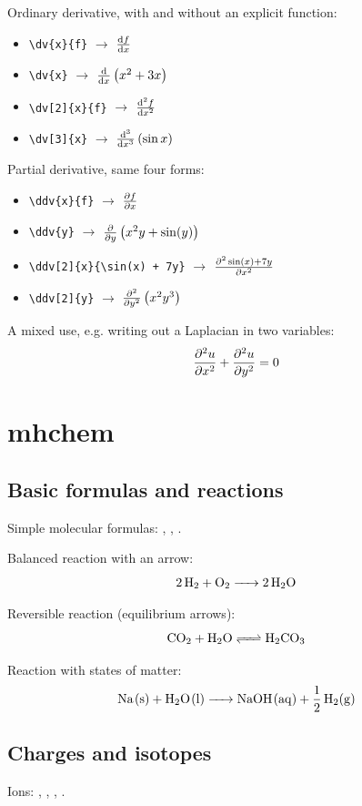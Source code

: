Ordinary derivative, with and without an explicit function:
\begin{itemize}
	\item \verb|\dv{x}{f}| \quad $\to$ \quad $\dv{x}{f}$
	\item \verb|\dv{x}| \quad $\to$ \quad $\dv{x}\left(x^2 + 3x\right)$
	\item \verb|\dv[2]{x}{f}| \quad $\to$ \quad $\dv[2]{x}{f}$
	\item \verb|\dv[3]{x}| \quad $\to$ \quad $\dv[3]{x}\left(\sin x\right)$
\end{itemize}

Partial derivative, same four forms:
\begin{itemize}
	\item \verb|\ddv{x}{f}| \quad $\to$ \quad $\ddv{x}{f}$
	\item \verb|\ddv{y}| \quad $\to$ \quad $\ddv{y}\left(x^2 y + \sin(y)\right)$
	\item \verb|\ddv[2]{x}{\sin(x) + 7y}| \quad $\to$ \quad $\ddv[2]{x}{\sin(x) + 7y}$
	\item \verb|\ddv[2]{y}| \quad $\to$ \quad $\ddv[2]{y}\left(x^2 y^3\right)$
\end{itemize}

A mixed use, e.g. writing out a Laplacian in two variables:
\[
	\ddv[2]{x}{u} + \ddv[2]{y}{u} = 0
\]

\section{mhchem}

\subsection{Basic formulas and reactions}

Simple molecular formulas: , , .

Balanced reaction with an arrow:
\[
	\ce{2H2 + O2 -> 2H2O}
\]

Reversible reaction (equilibrium arrows):
\[
	\ce{CO2 + H2O <=> H2CO3}
\]

Reaction with states of matter:
\[
	\ce{Na(s) + H2O(l) -> NaOH(aq) + 1/2 H2(g)}
\]

\subsection{Charges and isotopes}

Ions: , , , .

